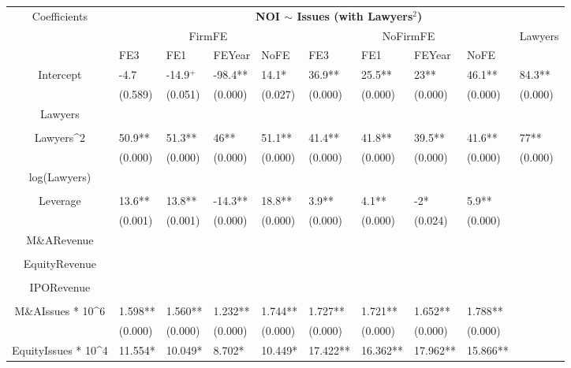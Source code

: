 \documentclass{article}
\begin{document}
\begin{table}[H]
\centering
\begin{tabular}{|clllllllll|}
\hline
\multirow{3}{*}{Coefficients} & \multicolumn{9}{c|}{\textbf{NOI $\sim$ Issues (with Lawyers$^2$)}} \\
\cline{2-10}
& \multicolumn{4}{c}{FirmFE} & \multicolumn{4}{c}{NoFirmFE} & \multirow{2}{*}{Lawyers} \\
\cline{2-9}
& FE3 & FE1 & FEYear & NoFE & FE3 & FE1 & FEYear & NoFE &  \\
\hline
 
Intercept & -4.7 & -14.9$^{+}$ & -98.4** & 14.1* & 36.9** & 25.5** & 23** & 46.1** & 84.3** \\ 
   & (0.589) & (0.051) & (0.000) & (0.027) & (0.000) & (0.000) & (0.000) & (0.000) & (0.000) \\ 
  Lawyers &  &  &  &  &  &  &  &  &  \\ 
   &  &  &  &  &  &  &  &  &  \\ 
  Lawyers^2 & 50.9** & 51.3** & 46** & 51.1** & 41.4** & 41.8** & 39.5** & 41.6** & 77** \\ 
   & (0.000) & (0.000) & (0.000) & (0.000) & (0.000) & (0.000) & (0.000) & (0.000) & (0.000) \\ 
  log(Lawyers) &  &  &  &  &  &  &  &  &  \\ 
   &  &  &  &  &  &  &  &  &  \\ 
  Leverage & 13.6** & 13.8** & -14.3** & 18.8** & 3.9** & 4.1** & -2* & 5.9** &  \\ 
   & (0.001) & (0.001) & (0.000) & (0.000) & (0.000) & (0.000) & (0.024) & (0.000) &  \\ 
  M\&ARevenue &  &  &  &  &  &  &  &  &  \\ 
   &  &  &  &  &  &  &  &  &  \\ 
  EquityRevenue &  &  &  &  &  &  &  &  &  \\ 
   &  &  &  &  &  &  &  &  &  \\ 
  IPORevenue &  &  &  &  &  &  &  &  &  \\ 
   &  &  &  &  &  &  &  &  &  \\ 
  M\&AIssues * 10^6 & 1.598** & 1.560** & 1.232** & 1.744** & 1.727** & 1.721** & 1.652** & 1.788** &  \\ 
   & (0.000) & (0.000) & (0.000) & (0.000) & (0.000) & (0.000) & (0.000) & (0.000) &  \\ 
  EquityIssues * 10^4 & 11.554* & 10.049* & 8.702* & 10.449* & 17.422** & 16.362** & 17.962** & 15.866** &  \\ 

\end{tabular}
\end{table}
\end{document}
